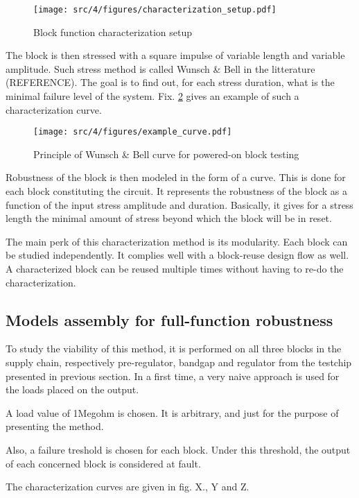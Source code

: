 \begin{figure}[h]
  \centering
  \texttt{[image: src/4/figures/characterization\_setup.pdf]}
  \caption{Block function characterization setup}
  \label{block_function_cz}
\end{figure}

The block is then stressed with a square impulse of variable length and variable amplitude.
Such stress method is called Wunsch & Bell in the litterature (REFERENCE).
The goal is to find out, for each stress duration, what is the minimal failure level of the system.
Fix. \ref{wb_cz_curve_example} gives an example of such a characterization curve.

\begin{figure}[h]
  \centering
  \texttt{[image: src/4/figures/example\_curve.pdf]}
  \caption{Principle of Wunsch & Bell curve for powered-on block testing}
  \label{wb_cz_curve_example}
\end{figure}

Robustness of the block is then modeled in the form of a curve.
This is done for each block constituting the circuit.
It represents the robustness of the block as a function of the input stress amplitude and duration.
Basically, it gives for a stress length the minimal amount of stress beyond which the block will be in reset.

The main perk of this characterization method is its modularity.
Each block can be studied independently.
It complies well with a block-reuse design flow as well.
A characterized block can be reused multiple times without having to re-do the characterization.

\subsection{Models assembly for full-function robustness}

To study the viability of this method, it is performed on all three blocks in the supply chain, respectively pre-regulator,
bandgap and regulator from the testchip presented in previous section.
In a first time, a very naive approach is used for the loads placed on the output.

A load value of 1Megohm is chosen.
It is arbitrary, and just for the purpose of presenting the method.

Also, a failure treshold is chosen for each block.
Under this threshold, the output of each concerned block is considered at fault.

The characterization curves are given in fig. X., Y and Z.

